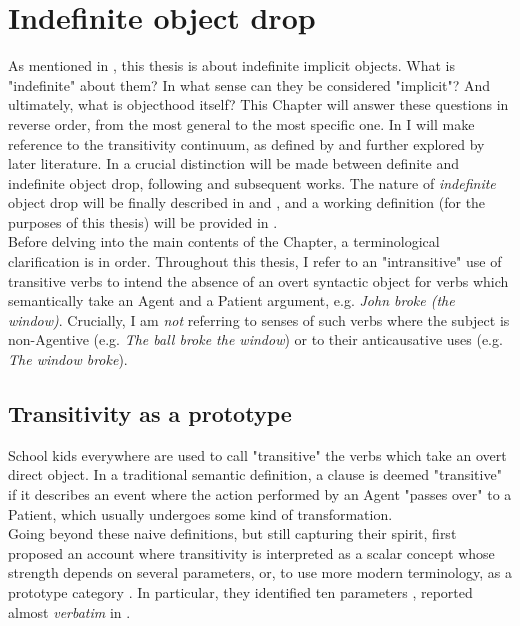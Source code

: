 \setchapterpreamble[u]{\margintoc}
\chapter{Indefinite object drop} %

As mentioned in , this thesis is about indefinite implicit objects. What is "indefinite" about them? In what sense can they be considered "implicit"? And ultimately, what is objecthood itself? This Chapter will answer these questions in reverse order, from the most general to the most specific one. In  I will make reference to the transitivity continuum, as defined by \textcite{HopperThompson1980} and further explored by later literature. In  a crucial distinction will be made between definite and indefinite object drop, following \textcite{Fillmore1986} and subsequent works. The nature of \textit{indefinite} object drop will be finally described in  and , and a working definition (for the purposes of this thesis) will be provided in .\\
Before delving into the main contents of the Chapter, a terminological clarification is in order. Throughout this thesis, I refer to an "intransitive" use of transitive verbs to intend the absence of an overt syntactic object for verbs which semantically take an Agent and a Patient argument, e.g. \textit{John broke (the window)}. Crucially, I am \textit{not} referring to senses of such verbs where the subject is non-Agentive (e.g. \textit{The ball broke the window}) or to their anticausative uses (e.g. \textit{The window broke}).


\section{Transitivity as a prototype} 

School kids everywhere are used to call "transitive" the verbs which take an overt direct object. In a traditional semantic definition, a clause is deemed "transitive" if it describes an event where the action performed by an Agent "passes over" to a Patient, which usually undergoes some kind of transformation.\\
Going beyond these naive definitions, but still capturing their spirit, \textcite{HopperThompson1980} first proposed an account where transitivity is interpreted as a scalar concept whose strength depends on several parameters, or, to use more modern terminology, as a prototype category \parencite{Naess2007}. In particular, they identified ten parameters \parencite[252]{HopperThompson1980}, reported almost \textit{verbatim} in .

